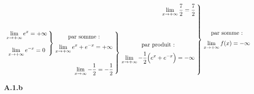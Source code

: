 \documentclass{article}
\begin{document}
\[
    \left.\begin{matrix*}[r]
       \displaystyle\lim_{x\rightarrow+\infty} \displaystyle\frac{7}{2} = \displaystyle\frac{7}{2}\\
       \\
       \\
       \left.\begin{matrix*}[r]
            \left.\begin{matrix*}
                \displaystyle\lim_{x\rightarrow+\infty} e^{x} = +\infty\\
               \\
               \displaystyle\lim_{x\rightarrow+\infty} e^{-x} = 0\\
            \end{matrix*}\medspace\right\}
            \left.\begin{matrix*}
                \space\text{par somme :}
                \vspace{2mm}\\
                \displaystyle\lim_{x\rightarrow+\infty} \displaystyle e^x+e^{-x} = +\infty
            \end{matrix*}\right.    
           \\
           \\
           \displaystyle\lim_{x\rightarrow\infty} -\displaystyle\frac{1}{2} = -\displaystyle\frac{1}{2}\\
        \end{matrix*}\medspace\right\}
        \left.\begin{matrix*}
            \space\text{par produit :}\vspace{2mm}\\
            \displaystyle\lim_{x\rightarrow+\infty} -\displaystyle\frac{1}{2}\Big(e^x + e^{-x}\Big) = -\infty
        \end{matrix*}\right.
    \end{matrix*}\medspace\right\}
    \left.\begin{matrix*}
        \space\text{par somme :}\vspace{2mm}\\
        \displaystyle\lim_{x\rightarrow+\infty}  
        f(x) = -\infty
    \end{matrix*}\right.
\] 


\vspace{2mm}

\textbf{A.1.b}

\vspace{2mm}
\end{document}
